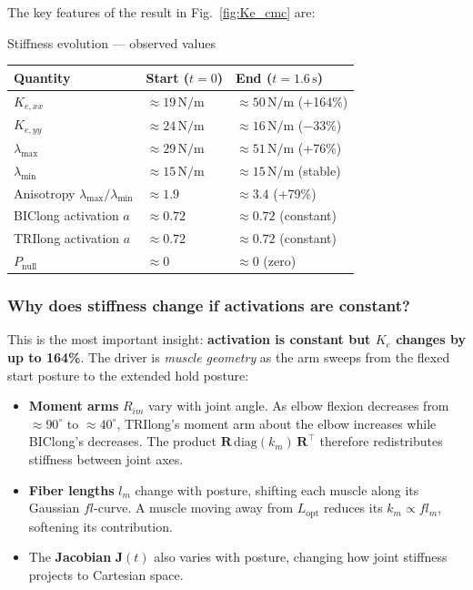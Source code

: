 \documentclass[11pt,a4paper]{article}
\newcommand{\bR}{\bm{R}}
\begin{document}
The key features of the result in Fig.~\ref{fig:Ke_cmc} are:

\begin{notebox}[PipeBlue]{Stiffness evolution — observed values}
\begin{tabular}{lll}
\toprule
\textbf{Quantity} & \textbf{Start ($t=0$)} & \textbf{End ($t=1.6\,\text{s}$)}  \\
\midrule
\rowcolor{LightBlue} $K_{e,xx}$ & $\approx19\,\text{N/m}$ & $\approx50\,\text{N/m}$ (+164\%) \\
$K_{e,yy}$ & $\approx24\,\text{N/m}$ & $\approx16\,\text{N/m}$ ($-33$\%) \\
\rowcolor{LightBlue} $\lambda_{\max}$ & $\approx29\,\text{N/m}$ & $\approx51\,\text{N/m}$ (+76\%) \\
$\lambda_{\min}$ & $\approx15\,\text{N/m}$ & $\approx15\,\text{N/m}$ (stable) \\
\rowcolor{LightBlue} Anisotropy $\lambda_{\max}/\lambda_{\min}$ & $\approx1.9$ & $\approx3.4$ (+79\%) \\
BIClong activation $a$ & $\approx0.72$ & $\approx0.72$ (constant) \\
\rowcolor{LightBlue} TRIlong activation $a$ & $\approx0.72$ & $\approx0.72$ (constant) \\
$P_\text{null}$ & $\approx0$ & $\approx0$ (zero) \\
\bottomrule
\end{tabular}
\end{notebox}

\subsubsection{Why does stiffness change if activations are constant?}

This is the most important insight: \textbf{activation is constant but
$K_e$ changes by up to 164\%}.  The driver is \emph{muscle geometry}
as the arm sweeps from the flexed start posture to the extended hold posture:

\begin{itemize}\itemsep2pt
  \item \textbf{Moment arms} $R_{im}$ vary with joint angle.  As elbow flexion
    decreases from $\approx90^\circ$ to $\approx40^\circ$, TRIlong's moment arm
    about the elbow increases while BIClong's decreases.  The product
    $\bR\,\mathrm{diag}(k_m)\,\bR^\top$ therefore redistributes stiffness
    between joint axes.
  \item \textbf{Fiber lengths} $l_m$ change with posture, shifting each muscle
    along its Gaussian $fl$-curve.  A muscle moving away from $L_\text{opt}$
    reduces its $k_m \propto fl_m$, softening its contribution.
  \item The \textbf{Jacobian} $\bm{J}(t)$ also varies with posture, changing
    how joint stiffness projects to Cartesian space.
\end{itemize}
\end{document}
